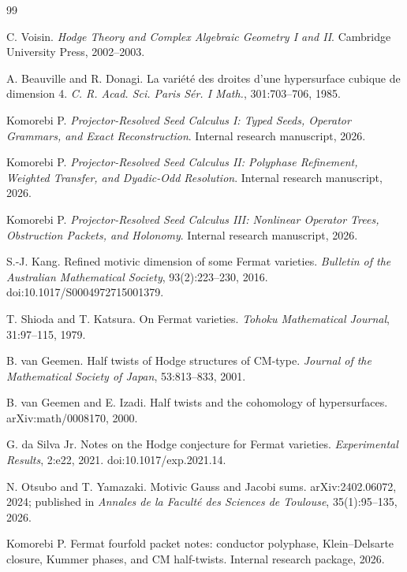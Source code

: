 \documentclass[11pt,oneside]{book}
\theoremstyle{definition}
\theoremstyle{remark}
\begin{document}
{\small
\begin{thebibliography}{99}
\setlength{\itemsep}{0.18em}

C. Voisin.
\newblock \emph{Hodge Theory and Complex Algebraic Geometry I and II}.
\newblock Cambridge University Press, 2002--2003.

A. Beauville and R. Donagi.
\newblock La vari\'et\'e des droites d'une hypersurface cubique de dimension 4.
\newblock \emph{C. R. Acad. Sci. Paris S\'er. I Math.}, 301:703--706, 1985.

Komorebi P.
\newblock \emph{Projector-Resolved Seed Calculus I: Typed Seeds, Operator Grammars, and Exact Reconstruction}.
\newblock Internal research manuscript, 2026.

Komorebi P.
\newblock \emph{Projector-Resolved Seed Calculus II: Polyphase Refinement, Weighted Transfer, and Dyadic-Odd Resolution}.
\newblock Internal research manuscript, 2026.

Komorebi P.
\newblock \emph{Projector-Resolved Seed Calculus III: Nonlinear Operator Trees, Obstruction Packets, and Holonomy}.
\newblock Internal research manuscript, 2026.

S.-J. Kang.
\newblock Refined motivic dimension of some Fermat varieties.
\newblock \emph{Bulletin of the Australian Mathematical Society}, 93(2):223--230, 2016.
\newblock doi:10.1017/S0004972715001379.

T. Shioda and T. Katsura.
\newblock On Fermat varieties.
\newblock \emph{Tohoku Mathematical Journal}, 31:97--115, 1979.

B. van Geemen.
\newblock Half twists of Hodge structures of CM-type.
\newblock \emph{Journal of the Mathematical Society of Japan}, 53:813--833, 2001.

B. van Geemen and E. Izadi.
\newblock Half twists and the cohomology of hypersurfaces.
\newblock arXiv:math/0008170, 2000.

G. da Silva Jr.
\newblock Notes on the Hodge conjecture for Fermat varieties.
\newblock \emph{Experimental Results}, 2:e22, 2021.
\newblock doi:10.1017/exp.2021.14.

N. Otsubo and T. Yamazaki.
\newblock Motivic Gauss and Jacobi sums.
\newblock arXiv:2402.06072, 2024; published in \emph{Annales de la Facult\'e des Sciences de Toulouse}, 35(1):95--135, 2026.

Komorebi P.
\newblock Fermat fourfold packet notes: conductor polyphase, Klein--Delsarte closure, Kummer phases, and CM half-twists.
\newblock Internal research package, 2026.

\end{thebibliography}
}
\end{document}

